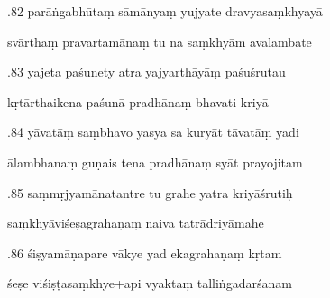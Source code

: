 \documentclass[article,12pt,a4paper]{memoir}%
\newcounter{parCount}
\begin{document}
	  
	  \pstart {}.82 parāṅgabhūtaṃ sāmānyaṃ yujyate dravyasaṃkhyayā 
	{}
	\pend%
      

	  
	  \pstart \leavevmode%
	svārthaṃ pravartamānaṃ tu na saṃkhyām avalambate 
	{}
	\pend%
      

	  
	  \pstart {}.83 yajeta paśunety atra yajyarthāyāṃ paśuśrutau 
	{}
	\pend%
      

	  
	  \pstart \leavevmode%
	kṛtārthaikena paśunā pradhānaṃ bhavati kriyā 
	{}
	\pend%
      

	  
	  \pstart {}.84 yāvatāṃ saṃbhavo yasya sa kuryāt tāvatāṃ yadi 
	{}
	\pend%
      

	  
	  \pstart \leavevmode%
	ālambhanaṃ guṇais tena pradhānaṃ syāt prayojitam 
	{}
	\pend%
      

	  
	  \pstart {}.85 saṃmṛjyamānatantre tu grahe yatra kriyāśrutiḥ 
	{}
	\pend%
      

	  
	  \pstart \leavevmode%
	saṃkhyāviśeṣagrahaṇaṃ naiva tatrādriyāmahe 
	{}
	\pend%
      

	  
	  \pstart {}.86 śiṣyamāṇapare vākye yad ekagrahaṇaṃ kṛtam 
	{}
	\pend%
      

	  
	  \pstart \leavevmode%
	śeṣe viśiṣṭasaṃkhye+api vyaktaṃ talliṅgadarśanam 
	{}
	\pend%
      
\end{document}
